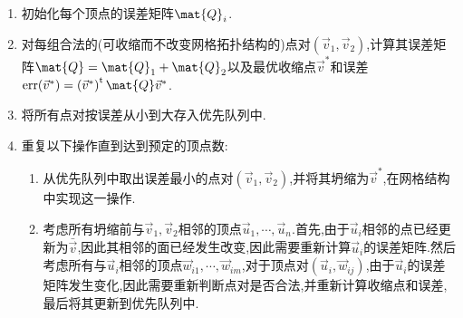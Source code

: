 \documentclass{ctexart}
\begin{document}
\begin{enumerate}[label=\tbf{\arabic*.},topsep=0pt,parsep=0pt,itemsep=0pt,partopsep=0pt]
    \item 初始化每个顶点的误差矩阵$\mat{Q}_i$.
    \item 对每组合法的(可收缩而不改变网格拓扑结构的)点对$(\vec{v}_1,\vec{v}_2)$,计算其误差矩阵$\mat{Q}=\mat{Q}_1+\mat{Q}_2$以及最优收缩点$\vec{v}^\ast$和误差$\text{err}(\vec{v}^\ast)=\left(\vec{v}^\ast\right)^{\text{t}}\mat{Q}\vec{v}^\ast$.
    \item 将所有点对按误差从小到大存入优先队列中.
    \item 重复以下操作直到达到预定的顶点数:
    \begin{enumerate}[label=\tbf{\alph*.},topsep=0pt,parsep=0pt,itemsep=0pt,partopsep=0pt]
        \item 从优先队列中取出误差最小的点对$(\vec{v}_1,\vec{v}_2)$,并将其坍缩为$\vec{v}^\ast$,在网格结构中实现这一操作.
        \item 考虑所有坍缩前与$\vec{v}_1,\vec{v}_2$相邻的顶点$\vec{u}_1,\cdots,\vec{u}_n$.首先,由于$\vec{u}_i$相邻的点已经更新为$\bar{\vec{v}}$,因此其相邻的面已经发生改变,因此需要重新计算$\vec{u}_i$的误差矩阵.然后考虑所有与$\vec{u}_i$相邻的顶点$\vec{w}_{i1},\cdots,\vec{w}_{im}$,对于顶点对$\left(\vec{u}_i,\vec{w}_{ij}\right)$,由于$\vec{u}_i$的误差矩阵发生变化,因此需要重新判断点对是否合法,并重新计算收缩点和误差,最后将其更新到优先队列中.
    \end{enumerate}
\end{enumerate}
\end{document}
